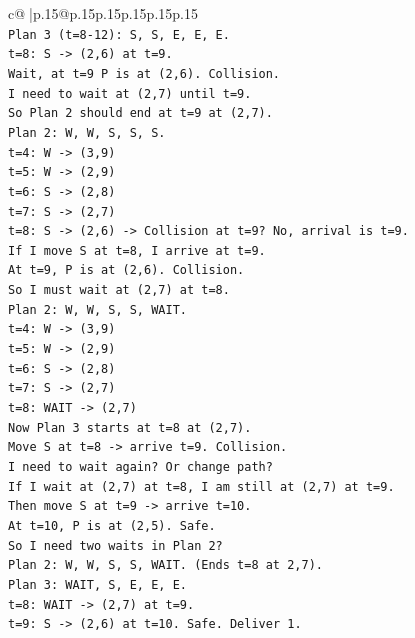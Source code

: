 \documentclass{article}
\begin{document}
{\begin{supertabular}{c@{$\;$}|p{.15\linewidth}@{}p{.15\linewidth}p{.15\linewidth}p{.15\linewidth}p{.15\linewidth}p{.15\linewidth}}
{{{\\ 
\texttt{Plan 3 (t=8{-}12): S, S, E, E, E.} \\
\texttt{t=8: S {-}> (2,6) at t=9.} \\
\texttt{Wait, at t=9 P is at (2,6). Collision.} \\
\texttt{I need to wait at (2,7) until t=9.} \\
\texttt{So Plan 2 should end at t=9 at (2,7).} \\
\texttt{Plan 2: W, W, S, S, S.} \\
\texttt{t=4: W {-}> (3,9)} \\
\texttt{t=5: W {-}> (2,9)} \\
\texttt{t=6: S {-}> (2,8)} \\
\texttt{t=7: S {-}> (2,7)} \\
\texttt{t=8: S {-}> (2,6) {-}> Collision at t=9? No, arrival is t=9.} \\
\texttt{If I move S at t=8, I arrive at t=9.} \\
\texttt{At t=9, P is at (2,6). Collision.} \\
\texttt{So I must wait at (2,7) at t=8.} \\
\texttt{Plan 2: W, W, S, S, WAIT.} \\
\texttt{t=4: W {-}> (3,9)} \\
\texttt{t=5: W {-}> (2,9)} \\
\texttt{t=6: S {-}> (2,8)} \\
\texttt{t=7: S {-}> (2,7)} \\
\texttt{t=8: WAIT {-}> (2,7)} \\
\texttt{Now Plan 3 starts at t=8 at (2,7).} \\
\texttt{Move S at t=8 {-}> arrive t=9. Collision.} \\
\texttt{I need to wait again? Or change path?} \\
\texttt{If I wait at (2,7) at t=8, I am still at (2,7) at t=9.} \\
\texttt{Then move S at t=9 {-}> arrive t=10.} \\
\texttt{At t=10, P is at (2,5). Safe.} \\
\texttt{So I need two waits in Plan 2?} \\
\texttt{Plan 2: W, W, S, S, WAIT. (Ends t=8 at 2,7).} \\
\texttt{Plan 3: WAIT, S, E, E, E.} \\
\texttt{t=8: WAIT {-}> (2,7) at t=9.} \\
\texttt{t=9: S {-}> (2,6) at t=10. Safe. Deliver 1.} \\
}}}
\end{supertabular}}
\end{document}
